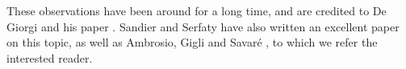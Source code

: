 These observations have been around for a long time, and are credited 
to De Giorgi and his paper 
\cite{de_giorgi_new_problems_on_minimizing_movements}. Sandier and Serfaty have 
also written an excellent paper on this topic, as well as Ambrosio, Gigli and 
Savaré 
\cite{ambrosio_gigli_savare_gradient_flows_in_metric_spaces_and_in_the_space_of_prob_measures},
to which we refer the 
interested reader.